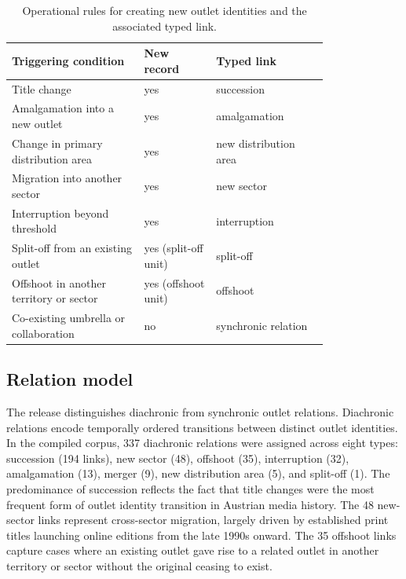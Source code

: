\documentclass[11pt]{article}
\begin{document}
\begin{table}[t]
  \centering
  \small
  \begin{tabular}{>{\raggedright\arraybackslash}p{0.33\linewidth}>{\raggedright\arraybackslash}p{0.18\linewidth}>{\raggedright\arraybackslash}p{0.29\linewidth}}
    \toprule
    Triggering condition & New record & Typed link \\
    \midrule
    Title change & yes & succession \\
    Amalgamation into a new outlet & yes & amalgamation \\
    Change in primary distribution area & yes & new distribution area \\
    Migration into another sector & yes & new sector \\
    Interruption beyond threshold & yes & interruption \\
    Split-off from an existing outlet & yes (split-off unit) & split-off \\
    Offshoot in another territory or sector & yes (offshoot unit) & offshoot \\
    Co-existing umbrella or collaboration & no & synchronic relation \\
    \bottomrule
  \end{tabular}
  \caption{Operational rules for creating new outlet identities and the associated typed link.}
  \label{tab:identityrules}
\end{table}

\subsection{Relation model}

The release distinguishes diachronic from synchronic outlet relations. Diachronic relations encode temporally ordered transitions between distinct outlet identities. In the compiled corpus, 337 diachronic relations were assigned across eight types: succession (194 links), new sector (48), offshoot (35), interruption (32), amalgamation (13), merger (9), new distribution area (5), and split-off (1). The predominance of succession reflects the fact that title changes were the most frequent form of outlet identity transition in Austrian media history. The 48 new-sector links represent cross-sector migration, largely driven by established print titles launching online editions from the late 1990s onward. The 35 offshoot links capture cases where an existing outlet gave rise to a related outlet in another territory or sector without the original ceasing to exist.
\end{document}
